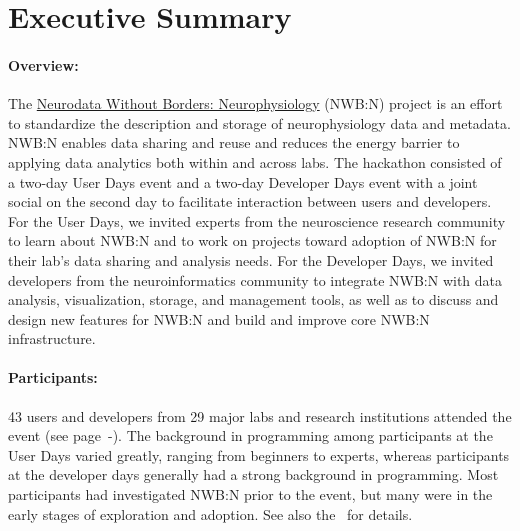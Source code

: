 \documentclass{article}
\begin{document}
\section{Executive Summary}
\label{sec:es}

\paragraph{Overview:} The \href{https://neurodatawithoutborders.github.io}{Neurodata Without Borders: Neurophysiology} (NWB:N) project is an effort to standardize the description and storage of neurophysiology data and metadata. NWB:N enables data sharing and reuse and reduces the energy barrier to applying data analytics both within and across labs. The hackathon consisted of a two-day User Days event and a two-day Developer Days event with a joint social on the second day to facilitate interaction between users and developers. For the User Days, we invited experts from the neuroscience research community to learn about NWB:N and to work on projects toward adoption of NWB:N for their lab's data sharing and analysis needs. For the Developer Days, we invited developers from the neuroinformatics community to integrate NWB:N with data analysis, visualization, storage, and management tools, as well as to discuss and design new features for NWB:N and build and improve core NWB:N infrastructure. 
\vspace{-0.2cm}
\paragraph{Participants:} 43 users and developers from 29 major labs and research institutions attended the event (see page~\pageref{sec:userparticipants}-\pageref{sec:devparticipants}). The background in programming among participants at the User Days varied greatly, ranging from beginners to experts, whereas participants at the developer days generally had a strong background in programming. Most participants had investigated NWB:N prior to the event, but many were in the early stages of exploration and adoption. See also the~ for details.

\vspace{-0.2cm}
\end{document}
